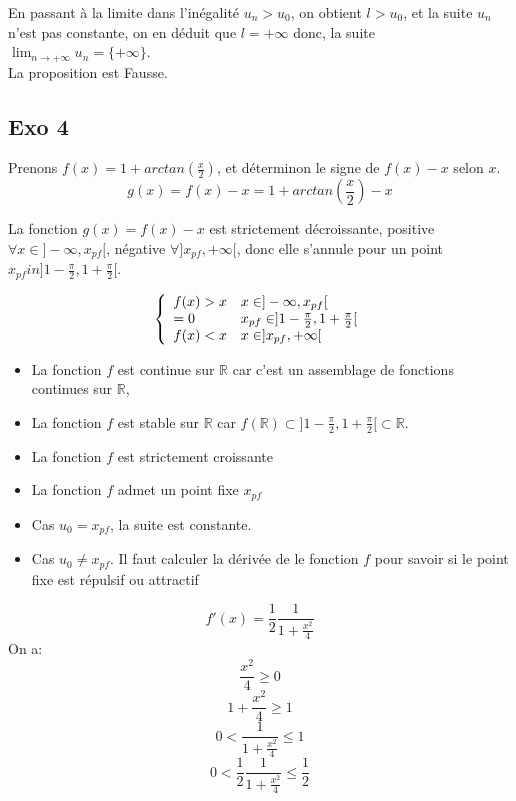\documentclass[]{book}
\theoremstyle{definition}
\newcommand{\bb}[1]{\mathbb{#1}}
\newcommand{\R}{\bb{R}}
\begin{document}
En passant \`a la limite dans l'in\'egalit\'e $u_n > u_0$, on obtient $l > u_0$, et la suite $u_n$ n'est pas constante, on en d\'eduit que $l=+\infty$ donc, la suite $\lim_{n \to +\infty} u_n = \{+\infty\}$. \\


La proposition est Fausse.

\subsection*{Exo 4}
Prenons $f(x) = 1 + arctan(\frac{x}{2})$, et d\'eterminon le signe de $f(x) - x$ selon $x$.\\
$$g(x) = f(x) - x = 1 + arctan(\frac{x}{2}) - x$$

La fonction $g(x) = f(x) - x$ est strictement d\'ecroissante, positive $\forall x \in ]-\infty,x_{pf}[$, n\'egative $\forall ]x_{pf},+\infty[$, donc elle s'annule pour un point $x_{pf} in ]1-\frac{\pi}{2}, 1+\frac{\pi}{2}[$.

$$
\left\{ 
\begin{array}{l l}
 f(x)>x   & x \in ]-\infty,x_{pf}[\\
 =0       & x_{pf} \in ]1-\frac{\pi}{2}, 1+\frac{\pi}{2}[\\
 f(x)<x   & x \in ]x_{pf},+\infty[ \\
\end{array}
\right. 
$$

\begin{itemize} 
\item La fonction $f$ est continue sur $\R$ car c'est un assemblage de fonctions continues sur $\R$,
\item La fonction $f$ est stable sur $\R$ car $f(\R) \subset ]1-\frac{\pi}{2},1+\frac{\pi}{2}[ \subset \R$.
\item La fonction $f$ est strictement croissante
\item La fonction $f$ admet un point fixe $x_{pf}$
\end{itemize} 

\medskip

\begin{itemize}
\item Cas $u_0=x_{pf}$, la suite est constante.
\item Cas $u_0 \neq x_{pf}$. Il faut calculer la d\'eriv\'ee de le fonction $f$ pour savoir si le point fixe est r\'epulsif ou attractif
\end{itemize}

$$f'(x) = \frac{1}{2}\frac{1}{1+\frac{x^2}{4}}$$
On a:
$$\frac{x^2}{4} \geq 0$$
$$1 + \frac{x^2}{4} \geq 1$$
$$0 < \frac{1}{1+\frac{x^2}{4}} \leq 1$$
$$0 < \frac{1}{2} \frac{1}{1+\frac{x^2}{4}} \leq \frac{1}{2}$$
\end{document}
